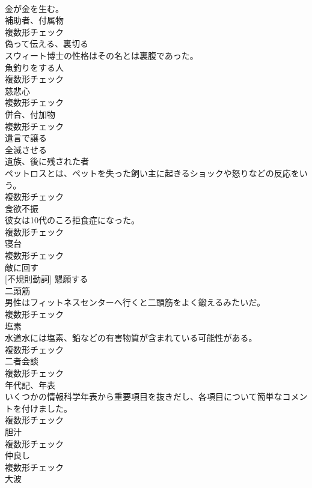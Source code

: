 \documentclass[8pt]{extreport}
\begin{document}
\begin{CJK}{UTF8}{min}
\\	金が金を生む。	
\\	[名詞]	補助者、付属物	
\\	複数形チェック
\\	[動詞]	偽って伝える、裏切る	
\\	スウィート博士の性格はその名とは裏腹であった。	
\\	[名詞]	魚釣りをする人	
\\	複数形チェック
\\	[名詞]	慈悲心	
\\	複数形チェック
\\	[名詞]	併合、付加物	
\\	複数形チェック
\\	[動詞]	遺言で譲る	
\\	[動詞]	全滅させる	
\\	[名詞]	遺族、後に残された者	
\\	ペットロスとは、ペットを失った飼い主に起きるショックや怒りなどの反応をいう。	
\\	複数形チェック
\\	[名詞]	食欲不振	
\\	彼女は10代のころ拒食症になった。	
\\	複数形チェック
\\	[名詞]	寝台	
\\	複数形チェック
\\	[動詞]	敵に回す	
\\	[動詞] [不規則動詞]	懇願する	
\\	[名詞]	二頭筋	
\\	男性はフィットネスセンターへ行くと二頭筋をよく鍛えるみたいだ。	
\\	複数形チェック
\\	[名詞]	塩素	
\\	水道水には塩素、鉛などの有害物質が含まれている可能性がある。	
\\	複数形チェック
\\	[名詞]	二者会談	
\\	複数形チェック
\\	[名詞]	年代記、年表	
\\	いくつかの情報科学年表から重要項目を抜きだし、各項目について簡単なコメントを付けました。	
\\	複数形チェック
\\	[名詞]	胆汁	
\\	複数形チェック
\\	[名詞]	仲良し	
\\	複数形チェック
\\	[名詞]	大波	

\end{CJK}
\end{document}
